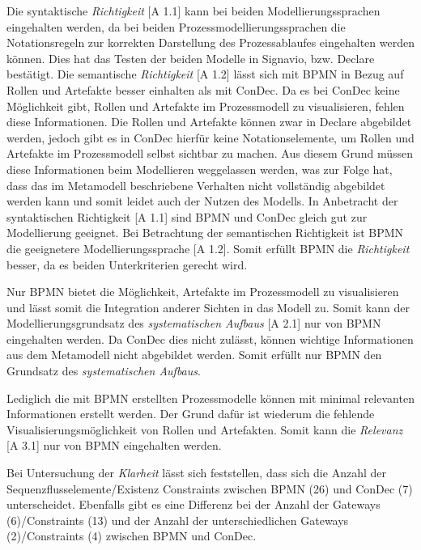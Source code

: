 Die syntaktische \textit{Richtigkeit} [A 1.1] kann bei beiden Modellierungssprachen eingehalten werden, da bei beiden Prozessmodellierungssprachen die Notationsregeln zur korrekten Darstellung des Prozessablaufes eingehalten werden können. Dies hat das Testen der beiden Modelle in Signavio, bzw. Declare bestätigt.\newline
Die semantische \textit{Richtigkeit} [A 1.2] lässt sich mit BPMN in Bezug auf Rollen und Artefakte besser einhalten als mit ConDec. Da es bei ConDec keine Möglichkeit gibt, Rollen und Artefakte im Prozessmodell zu visualisieren, fehlen diese Informationen. Die Rollen und Artefakte können zwar in Declare abgebildet werden, jedoch gibt es in ConDec hierfür keine Notationselemente, um Rollen und Artefakte im Prozessmodell selbst sichtbar zu machen. Aus diesem Grund müssen diese Informationen beim Modellieren weggelassen werden, was zur Folge hat, dass das im Metamodell beschriebene Verhalten nicht vollständig abgebildet werden kann und somit leidet auch der Nutzen des Modells.\newline
In Anbetracht der syntaktischen Richtigkeit [A 1.1] sind BPMN und ConDec gleich gut zur Modellierung geeignet. Bei Betrachtung der semantischen Richtigkeit ist  BPMN die geeignetere Modellierungssprache [A 1.2]. Somit erfüllt BPMN die \textit{Richtigkeit} besser, da es beiden Unterkriterien gerecht wird.\newline


Nur BPMN bietet die Möglichkeit, Artefakte im Prozessmodell zu visualisieren und lässt somit die Integration anderer Sichten in das Modell zu. Somit kann der Modellierungsgrundsatz des \textit{systematischen Aufbaus} [A 2.1] nur von BPMN eingehalten werden. Da ConDec dies nicht zulässt, können wichtige Informationen aus dem Metamodell nicht abgebildet werden. Somit erfüllt nur BPMN den Grundsatz des \textit{systematischen Aufbaus}.\newline 

Lediglich die mit BPMN erstellten Prozessmodelle können mit minimal relevanten Informationen erstellt werden. Der Grund dafür ist wiederum die fehlende Visualisierungsmöglichkeit von Rollen und Artefakten. Somit kann die \textit{Relevanz} [A 3.1] nur von BPMN eingehalten werden.\newline

Bei Untersuchung der \textit{Klarheit} lässt sich feststellen, dass sich die Anzahl der Sequenzflusselemente/Existenz Constraints zwischen BPMN (26) und ConDec (7) unterscheidet. Ebenfalls gibt es eine Differenz bei der Anzahl der Gateways (6)/Constraints (13) und der Anzahl der unterschiedlichen Gateways (2)/Constraints (4) zwischen BPMN und ConDec.\newline

